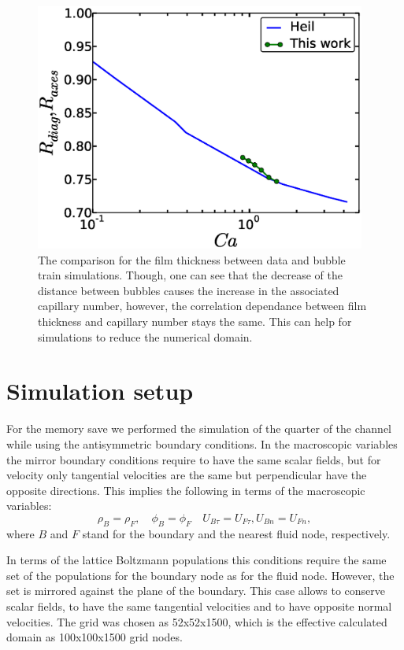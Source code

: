 \documentclass{article}
\begin{document}
\begin{figure}
\includegraphics[width=0.97\textwidth]{Figures/capillaries_comparison_train.eps}
\caption{The comparison for the film thickness between \citet{heil-threedim} data and bubble train
simulations. Though, one can see that the decrease of the distance between bubbles causes the
increase in the associated capillary number, however, the correlation dependance between film
thickness and capillary number stays the same. This can help for simulations to reduce the
numerical domain. \label{fig:capillaries:train}}
\end{figure}


\section{Simulation setup}

\label{append:sym}
For the memory save we performed the simulation of the quarter of the channel while using the
antisymmetric boundary conditions. In the macroscopic variables the mirror boundary conditions
require to have the same scalar fields, but for velocity only tangential velocities are the same
but perpendicular have the opposite directions. This implies the following in terms of the
macroscopic variables:
\begin{equation}
\rho_B = \rho_F, \quad \phi_B = \phi_F \quad U_{B\tau}=U_{F\tau}, U_{B n}=U_{F n}, 
\end{equation}
 where $B$ and $F$ stand for the boundary and the nearest fluid node, respectively. 

In terms of the lattice Boltzmann populations this conditions require the same set of the
populations for the boundary node as for the fluid node. However, the set is mirrored against the
plane of the boundary. This case allows to conserve scalar fields, to have the same tangential
velocities and to have opposite normal velocities. The grid was chosen as 52x52x1500, which is the
effective calculated domain as 100x100x1500 grid nodes. 



\end{document}

